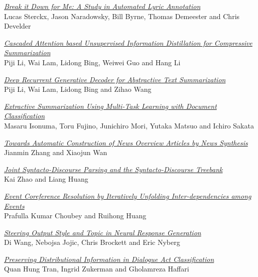 \hyperlink{page.2063}{\em Break it Down for Me: A Study in Automated Lyric Annotation}\samepage \\
\hspace*{7mm} Lucas Sterckx, Jason Naradowsky, Bill Byrne, Thomas Demeester and Chris Develder\dotfill {}

\hyperlink{page.2070}{\em Cascaded Attention based Unsupervised Information Distillation for Compressive Summarization}\samepage \\
\hspace*{7mm} Piji Li, Wai Lam, Lidong Bing, Weiwei Guo and Hang Li\dotfill {}

\hyperlink{page.2080}{\em Deep Recurrent Generative Decoder for Abstractive Text Summarization}\samepage \\
\hspace*{7mm} Piji Li, Wai Lam, Lidong Bing and Zihao Wang\dotfill {}

\hyperlink{page.2090}{\em Extractive Summarization Using Multi-Task Learning with Document Classification}\samepage \\
\hspace*{7mm} Masaru Isonuma, Toru Fujino, Junichiro Mori, Yutaka Matsuo and Ichiro Sakata\dotfill {}

\hyperlink{page.2100}{\em Towards Automatic Construction of News Overview Articles by News Synthesis}\samepage \\
\hspace*{7mm} Jianmin Zhang and Xiaojun Wan\dotfill {}

\hyperlink{page.2106}{\em Joint Syntacto-Discourse Parsing and the Syntacto-Discourse Treebank}\samepage \\
\hspace*{7mm} Kai Zhao and Liang Huang\dotfill {}

\hyperlink{page.2113}{\em Event Coreference Resolution by Iteratively Unfolding Inter-dependencies among Events}\samepage \\
\hspace*{7mm} Prafulla Kumar Choubey and Ruihong Huang\dotfill {}

\hyperlink{page.2123}{\em Steering Output Style and Topic in Neural Response Generation}\samepage \\
\hspace*{7mm} Di Wang, Nebojsa Jojic, Chris Brockett and Eric Nyberg\dotfill {}

\hyperlink{page.2134}{\em Preserving Distributional Information in Dialogue Act Classification}\samepage \\
\hspace*{7mm} Quan Hung Tran, Ingrid Zukerman and Gholamreza Haffari\dotfill {}

